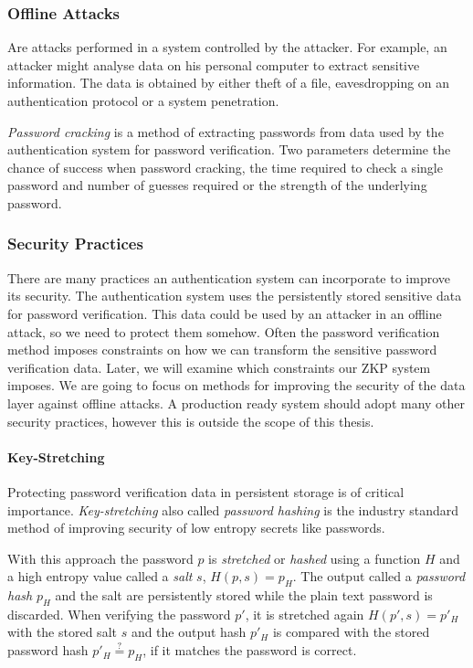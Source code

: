 \subsubsection{Offline Attacks}
Are attacks performed in a system controlled by the attacker.
For example, an attacker might analyse data on his personal computer to extract sensitive information.
The data is obtained by either theft of a file, eavesdropping on an authentication protocol or a system penetration.

\textit{Password cracking} \cite{blocki2018economics} is a method of extracting passwords from data used by the authentication system for password verification.
Two parameters determine the chance of success when password cracking, the time required to check a single password and number of guesses required or the strength of the underlying password.


\subsubsection{Security Practices}
\label{password-security-practices}
There are many practices an authentication system can incorporate to improve its security.
The authentication system uses the persistently stored sensitive data for password verification. This data could be used by an attacker in an offline attack, so we need to protect them somehow.
Often the password verification method imposes constraints on how we can transform the sensitive password verification data. Later, we will examine which constraints our ZKP system imposes.
We are going to focus on methods for improving the security of the data layer against offline attacks.
A production ready system should adopt many other security practices, however this is outside the scope of this thesis.

\paragraph{Key-Stretching}
\label{paragraph:password-hashing}
Protecting password verification data in persistent storage is of critical importance.
\textit{Key-stretching} \cite{hornby2016salted} also called \textit{password hashing} is the industry standard method of improving security of low entropy secrets like passwords.

With this approach the password $p$ is \textit{stretched} or \textit{hashed} using a function $H$ and a high entropy value called a \textit{salt} $s$, $H(p, s) = p_H$. The output called a \textit{password hash} $p_H$ and the salt are persistently stored while the plain text password is discarded. When verifying the password $p'$, it is stretched again $H(p', s) = p{'}_H$ with the stored salt $s$ and the output hash $p{'}_H$ is compared with the stored password hash $p{'}_H \stackrel{?}{=} p_H$, if it matches the password is correct.

